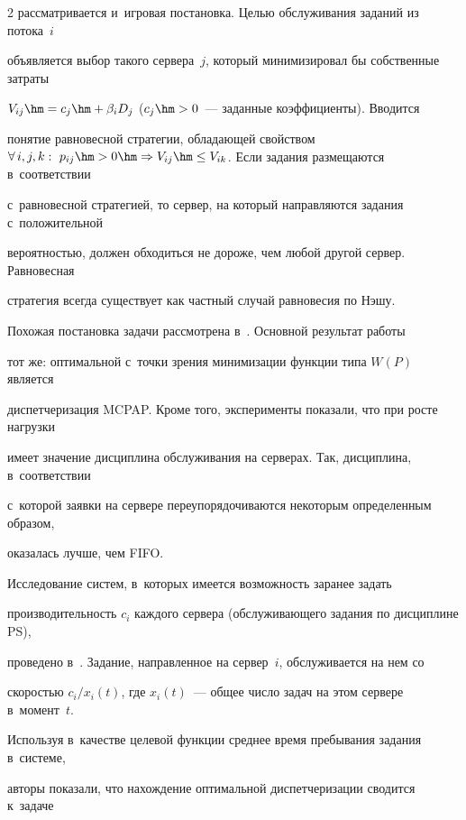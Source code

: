 \begin{multicols}{2}
рас\-смат\-ри\-ва\-ет\-ся и~игровая постановка. Целью обслуживания заданий из потока~$i$ 


объявляется выбор такого сервера~$j$, который минимизировал бы собственные затраты 


$V_{ij} \hm= c_j\hm+ \beta_i D_j$ ($c_j\hm>0$~--- заданные коэффициенты). Вводится 


понятие равновесной стратегии, обладающей свойством $\forall\,i,j,k:\ p_{ij}\hm> 


0\hm\Rightarrow V_{ij}\hm\leq V_{ik}$. Если задания размещаются в~соответствии 


с~равновесной стратегией, то сервер, на который направляются задания с~положительной 


вероятностью, должен обходиться не дороже, чем любой другой сервер. Равновесная 


стратегия всегда существует как частный случай равновесия по Нэшу.


    


    Похожая постановка задачи рассмотрена в~\cite{33-kon}. Основной результат работы 


тот же: оптимальной с~точки зрения минимизации функции типа $W(P)$ является 


диспетчеризация MCPAP. Кроме того, эксперименты показали, что при росте нагрузки 


имеет значение дисциплина обслуживания на серверах. Так, дисциплина, в~соответствии 


с~которой заявки на сервере переупорядочиваются некоторым определенным образом, 


оказалась лучше, чем FIFO.


    


    Исследование систем, в~которых имеется возможность заранее задать 


производительность $c_i$ каж\-до\-го сервера (обслуживающего задания по дисциплине PS), 


проведено в~\cite{1-kon}. Задание, направленное на сервер~$i$, обслуживается на нем со 


скоростью $c_i/x_i(t)$, где $x_i(t)$~--- общее число задач на этом сервере в~момент~$t$. 


Используя в~качестве целевой функции среднее время пребывания задания в~сис\-те\-ме, 


авторы показали, что нахождение оптимальной диспетчеризации сводится к~задаче 



\end{multicols}
